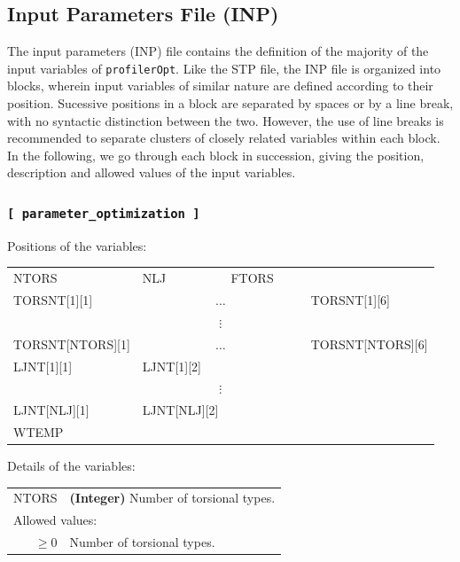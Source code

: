 \documentclass[10pt,a4paper,openany]{memoir}
\numberwithin{equation}{section}
\newcommand{\profileropt}[0]{\texttt{profilerOpt}}
\begin{document}
\subsection{Input Parameters File (INP)}
\label{sec:file-formats-INP}

The input parameters (INP) file contains the definition of the
majority of the input variables of \profileropt{}.  Like the STP file,
the INP file is organized into blocks, wherein input variables of
similar nature are defined according to their position.  Sucessive
positions in a block are separated by spaces or by a line break, with
no syntactic distinction between the two.  However, the use of line
breaks is recommended to separate clusters of closely related
variables within each block.  In the following, we go through each
block in succession, giving the position, description and allowed
values of the input variables.

\subsubsection{\texttt{[~parameter\_optimization~]}}
\label{sec:inp-parameter_optimization}

Positions of the variables:
\begin{center}
    \begin{tabular}{llllll}
    NTORS & NLJ & FTORS & & & \\
    TORSNT[1][1] & \multicolumn{4}{c}{$\ldots$} & TORSNT[1][6] \\
    \multicolumn{6}{c}{$\vdots$} \\
    TORSNT[NTORS][1] & \multicolumn{4}{c}{$\ldots$} & TORSNT[NTORS][6] \\
    LJNT[1][1] & LJNT[1][2] &  & & & \\
    \multicolumn{6}{c}{$\vdots$} \\
    LJNT[NLJ][1] & LJNT[NLJ][2] &  & & & \\
    WTEMP
  \end{tabular}
\end{center}

\noindent Details of the variables:
\vspace{2ex}

{
\begin{tabular}{r@{ : }l}
\label{descr:ntors}
     NTORS&\textbf{(Integer)} Number of torsional types.                                                       \\ 
\multicolumn{2}{l}{Allowed values:} \\ 
     \( \geq 0\)& Number of torsional types.                                                          \\ 
\end{tabular}
\vspace{1ex}
}
\end{document}
